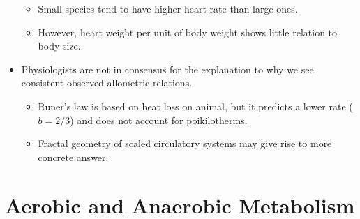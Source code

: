 \documentclass[12pt,a4paper]{article}
\begin{document}
\begin{itemize}
\begin{itemize}
            \item Small species tend to have higher heart rate than large ones.
            \item However, heart weight per unit of body weight shows little relation to body size.
        \end{itemize}
    \item Physiologists are not in consensus for the explanation to why we see consistent observed allometric relations.
        \begin{itemize}
            \item Runer's law is based on heat loss on animal, but it predicts a lower rate (\(b={2/3}\)) and does not account for poikilotherms.
            \item Fractal geometry of scaled circulatory systems may give rise to more concrete answer.
        \end{itemize}
\end{itemize}

\clearpage
\section{Aerobic and Anaerobic Metabolism}
\end{document}
